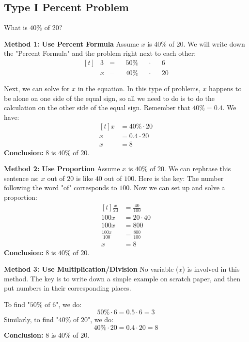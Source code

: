 \subsection{Type I Percent Problem}
\begin{myexample}
What is $40\%$ of $20$?
\end{myexample}
\begin{solution}

\textbf{Method 1: Use Percent Formula} Assume $x$ is $40\%$ of $20$. We will write down the "Percent Formula" and the problem right next to each other:
\[
\begin{aligned}[t]
	&3 &= &&50\% &&\cdot &&6 \\
	&x &= &&40\% &&\cdot &&20
\end{aligned}
\]

Next, we can solve for $x$ in the equation. In this type of problems, $x$ happens to be alone on one side of the equal sign, so all we need to do is to do the calculation on the other side of the equal sign. Remember that $40\%=0.4$. We have:
\[
\begin{aligned}[t]
	x &= 40\% \cdot 20 \\
	x &= 0.4 \cdot 20 \\
	x &= 8
\end{aligned}
\]
\textbf{Conclusion:} $8$ is $40\%$ of $20$.

\textbf{Method 2: Use Proportion}  Assume $x$ is $40\%$ of $20$. We can rephrase this sentence as: $x$ out of $20$ is like $40$ out of $100$. Here is the key: The number following the word "of" corresponds to $100$. Now we can set up and solve a proportion:
\[
\begin{aligned}[t]
	\frac{x}{20} &= \frac{40}{100} \\
	100x &= 20 \cdot 40 \\
	100x &= 800 \\
	\frac{100x}{100} &= \frac{800}{100} \\
	x &= 8
\end{aligned}
\]
\textbf{Conclusion:} $8$ is $40\%$ of $20$.

\textbf{Method 3: Use Multiplication/Division} No variable ($x$) is involved in this method. The key is to write down a simple example on scratch paper, and then put numbers in their corresponding places.

To find "$50\%$ of $6$", we do:
\[ 50\% \cdot 6=0.5\cdot6=3 \]
Similarly, to find "$40\%$ of $20$", we do:
\[ 40\% \cdot 20=0.4\cdot20=8 \]
\textbf{Conclusion:} $8$ is $40\%$ of $20$.

\end{solution}

